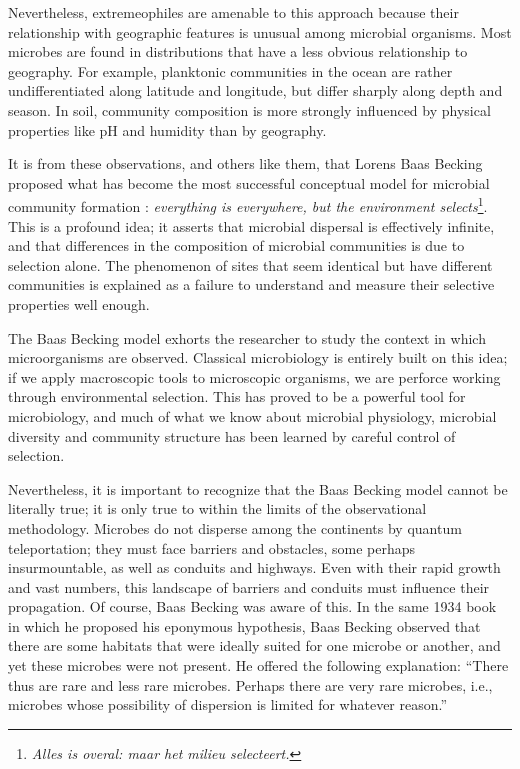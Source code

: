 Nevertheless, extremeophiles are amenable to this approach because their relationship with geographic features is unusual among microbial organisms. Most microbes are found in distributions that have a less obvious relationship to geography. For example, planktonic communities in the ocean are rather undifferentiated along latitude and longitude, but differ sharply along depth and season. In soil, community composition is more strongly influenced by physical properties like pH and humidity than by geography.

It is from these observations, and others like them, that Lorens Baas Becking proposed what has become the most successful conceptual model for microbial community formation : {\em everything is everywhere, but the environment selects}\footnote{{\em Alles is overal: maar het milieu selecteert.}}. This is a profound idea; it asserts that microbial dispersal is effectively infinite, and that differences in the composition of microbial communities is due to selection alone. The phenomenon of sites that seem identical but have different communities is explained as a failure to understand and measure their selective properties well enough.

The Baas Becking model exhorts the researcher to study the context in which microorganisms are observed. Classical microbiology is entirely built on this idea; if we apply macroscopic tools to microscopic organisms, we are perforce working through environmental selection. This has proved to be a powerful tool for microbiology, and much of what we know about microbial physiology, microbial diversity and community structure has been learned by careful control of selection. 

Nevertheless, it is important to recognize that the Baas Becking model cannot be literally true; it is only true to within the limits of the observational methodology. Microbes do not disperse among the continents by quantum teleportation; they must face barriers and obstacles, some perhaps insurmountable, as well as conduits and highways. Even with their rapid growth and vast numbers, this landscape of barriers and conduits must influence their propagation. Of course, Baas Becking was aware of this. In the same 1934 book in which he proposed his eponymous hypothesis, Baas Becking observed that there are some habitats that were ideally suited for one microbe or another, and yet these microbes were not present. He offered the following explanation: ``There thus are rare and less rare microbes. Perhaps there are very rare microbes, i.e., microbes whose possibility of dispersion is limited for whatever reason.''

